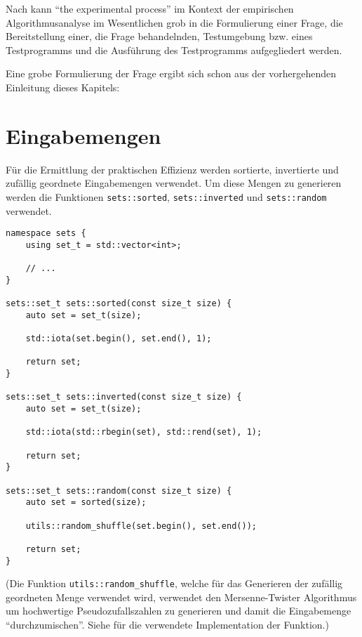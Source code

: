 Nach \cite[10]{mcg2012} kann \enquote{the experimental process} im Kontext der empirischen Algorithmusanalyse im Wesentlichen grob in die Formulierung einer Frage, die Bereitstellung einer, die Frage behandelnden, Testumgebung bzw. eines Testprogramms und die Ausführung des Testprogramms aufgegliedert werden.

Eine grobe Formulierung der Frage ergibt sich schon aus der vorhergehenden Einleitung dieses Kapitels:


\section{Eingabemengen}
\label{sec:runtime-inputs}

Für die Ermittlung der praktischen Effizienz werden sortierte, invertierte und zufällig geordnete Eingabemengen verwendet. Um diese Mengen zu generieren werden die Funktionen \lstinline{sets::sorted}, \lstinline{sets::inverted} und \lstinline{sets::random} verwendet.

\begin{lstlisting}[caption=Funktionen welche Mengen der verwendeten Eingabemengearten generieren.]
namespace sets {
    using set_t = std::vector<int>;

    // ...
}

sets::set_t sets::sorted(const size_t size) {
	auto set = set_t(size);

	std::iota(set.begin(), set.end(), 1);

	return set;
}

sets::set_t sets::inverted(const size_t size) {
	auto set = set_t(size);

	std::iota(std::rbegin(set), std::rend(set), 1);

	return set;
}

sets::set_t sets::random(const size_t size) {
	auto set = sorted(size);

	utils::random_shuffle(set.begin(), set.end());

	return set;
}
\end{lstlisting}

(Die Funktion \lstinline{utils::random_shuffle}, welche für das Generieren der zufällig geordneten Menge verwendet wird, verwendet den Mersenne-Twister Algorithmus um hochwertige Pseudozufallszahlen zu generieren und damit die Eingabemenge \enquote{durchzumischen}. Siehe  für die verwendete Implementation der Funktion.)

